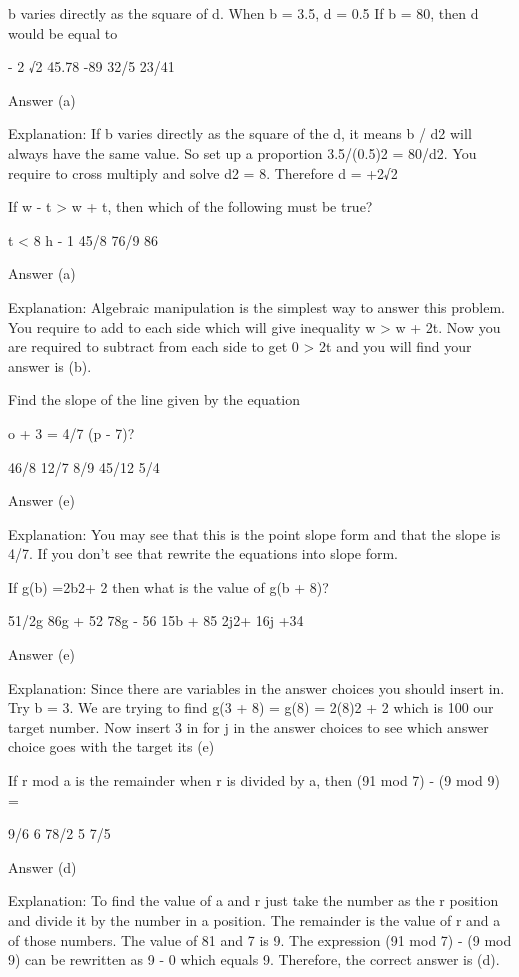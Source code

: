     b varies directly as the square of d. When b = 3.5, d = 0.5 If b = 80, then d would be equal to

        - 2 √2
        45.78
        -89
         32/5
        23/41 

    Answer (a)

    Explanation: If b varies directly as the square of the d, it means b / d2 will always have the same value. So set up a proportion 3.5/(0.5)2 = 80/d2. You require to cross multiply and solve d2 = 8. Therefore d = +2√2

    If w - t > w + t, then which of the following must be true?

        t < 8
        h - 1
        45/8
        76/9
        86 

    Answer (a)

    Explanation: Algebraic manipulation is the simplest way to answer this problem. You require to add to each side which will give inequality w > w + 2t. Now you are required to subtract from each side to get 0 > 2t and you will find your answer is (b).

    Find the slope of the line given by the equation

    o + 3 = 4/7 (p - 7)?

        46/8
        12/7
        8/9
        45/12
        5/4 

    Answer (e)

    Explanation: You may see that this is the point slope form and that the slope is 4/7. If you don't see that rewrite the equations into slope form.

    If g(b) =2b2+ 2 then what is the value of g(b + 8)?

        51/2g
        86g + 52
        78g - 56
        15b + 85
        2j2+ 16j +34 

    Answer (e)

    Explanation: Since there are variables in the answer choices you should insert in. Try b = 3. We are trying to find g(3 + 8) = g(8) = 2(8)2 + 2 which is 100 our target number. Now insert 3 in for j in the answer choices to see which answer choice goes with the target its (e)

    If r mod a is the remainder when r is divided by a, then (91 mod 7) - (9 mod 9) =

        9/6
        6
        78/2
        5
        7/5 

    Answer (d)

    Explanation: To find the value of a and r just take the number as the r position and divide it by the number in a position. The remainder is the value of r and a of those numbers. The value of 81 and 7 is 9. The expression (91 mod 7) - (9 mod 9) can be rewritten as 9 - 0 which equals 9. Therefore, the correct answer is (d).

